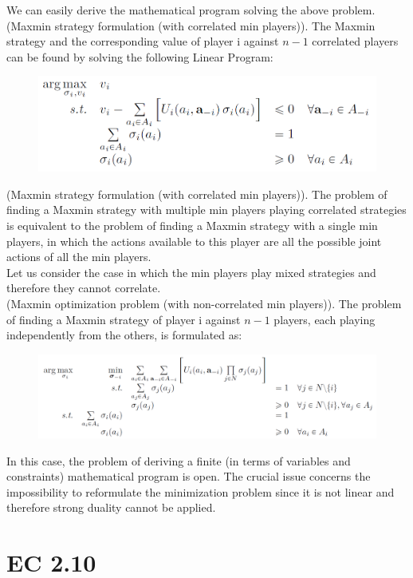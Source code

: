 \noindent
We can easily derive the mathematical program solving the above problem.\\
(Maxmin strategy formulation (with correlated min players)). The Maxmin strategy and the corresponding value of player i against $n-1$ correlated players can be found by solving the following Linear Program:
\begin{figure}[H]
\centering
\includegraphics[width=\textwidth]{images/img_2_9_05.png}
\end{figure}
\noindent
(Maxmin strategy formulation (with correlated min players)). The problem of finding a Maxmin strategy with multiple min players playing correlated strategies is equivalent to the problem of finding a Maxmin strategy with a single min players, in which the actions available to this player are all the possible joint actions of all the min players.\\
Let us consider the case in which the min players play mixed strategies and therefore they cannot correlate.\\
(Maxmin optimization problem (with non-correlated min players)). The problem of finding a Maxmin strategy of player i against $n-1$ players, each playing independently from the others, is formulated
as:
\begin{figure}[H]
\centering
\includegraphics[width=\textwidth]{images/img_2_9_06.png}
\end{figure}
\noindent
In this case, the problem of deriving a finite (in terms of variables and constraints) mathematical program
is open. The crucial issue concerns the impossibility to reformulate the minimization problem since it is not
linear and therefore strong duality cannot be applied.
\section{EC 2.10}

